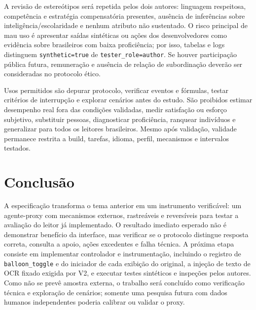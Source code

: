 \documentclass[conference]{IEEEtran}
\newcommand{\code}[1]{\texttt{#1}}
\begin{document}
A revisão de estereótipos será repetida pelos dois autores: linguagem respeitosa, competência e estratégia compensatória presentes, ausência de inferências sobre inteligência/escolaridade e nenhum atributo não sustentado. O risco principal de mau uso é apresentar saídas sintéticas ou ações dos desenvolvedores como evidência sobre brasileiros com baixa proficiência; por isso, tabelas e logs distinguem \code{synthetic=true} de \code{tester\_role=author}. Se houver participação pública futura, remuneração e ausência de relação de subordinação deverão ser consideradas no protocolo ético.

Usos permitidos são depurar protocolo, verificar eventos e fórmulas, testar critérios de interrupção e explorar cenários antes do estudo. São proibidos estimar desempenho real fora das condições validadas, medir satisfação ou esforço subjetivo, substituir pessoas, diagnosticar proficiência, ranquear indivíduos e generalizar para todos os leitores brasileiros. Mesmo após validação, validade permanece restrita a build, tarefas, idioma, perfil, mecanismos e intervalos testados.

\section{Conclusão}
A especificação transforma o tema anterior em um instrumento verificável: um agente-proxy com mecanismos externos, rastreáveis e reversíveis para testar a avaliação do leitor já implementado. O resultado imediato esperado não é demonstrar benefício da interface, mas verificar se o protocolo distingue resposta correta, consulta a apoio, ações excedentes e falha técnica. A próxima etapa consiste em implementar controlador e instrumentação, incluindo o registro de \code{balloon\_toggle} e do iniciador de cada exibição do original, a injeção de texto de OCR fixado exigida por V2, e executar testes sintéticos e inspeções pelos autores. Como não se prevê amostra externa, o trabalho será concluído como verificação técnica e exploração de cenários; somente uma pesquisa futura com dados humanos independentes poderia calibrar ou validar o proxy.
\end{document}

